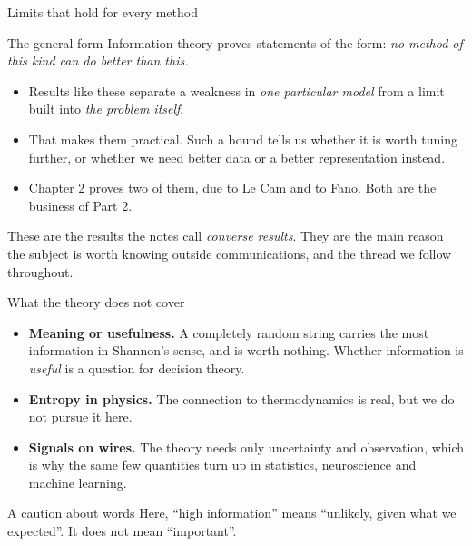 \documentclass[aspectratio=169,9pt]{beamer}
\newcommand{\orange}[1]{\textcolor{AmazonOrange}{\textbf{#1}}}
\newcommand{\muted}[1]{\textcolor{EPICMuted}{#1}}
\begin{document}
\begin{frame}{Limits that hold for every method}
\begin{block}{The general form}
Information theory proves statements of the form: \textit{no method of this kind can do better than this.}
\end{block}
\pause
\vspace{0.2cm}
\begin{itemize}
    \item Results like these separate a weakness in \textit{one particular model} from a limit built into
    \textit{the problem itself}.
    \pause
    \item That makes them practical. Such a bound tells us whether it is worth tuning further, or whether we
    need better data or a better representation instead.
    \pause
    \item Chapter 2 proves two of them, due to Le Cam and to Fano. Both are the business of Part 2.
\end{itemize}
\vspace{0.3cm}
\pause
\muted{These are the results the notes call \textit{converse results}. They are the main reason the subject is
worth knowing outside communications, and the thread we follow throughout.}
\end{frame}

\begin{frame}{What the theory does not cover}
\begin{itemize}
    \item \orange{Meaning or usefulness.} A completely random string carries the most information in Shannon's
    sense, and is worth nothing. Whether information is \textit{useful} is a question for decision theory.
    \pause
    \item \orange{Entropy in physics.} The connection to thermodynamics is real, but we do not pursue it here.
    \pause
    \item \orange{Signals on wires.} The theory needs only uncertainty and observation, which is why the same few
    quantities turn up in statistics, neuroscience and machine learning.
\end{itemize}
\vspace{0.25cm}
\pause
\begin{alertblock}{A caution about words}
Here, ``high information'' means ``unlikely, given what we expected''. It does not mean ``important''.
\end{alertblock}
\end{frame}
\end{document}

